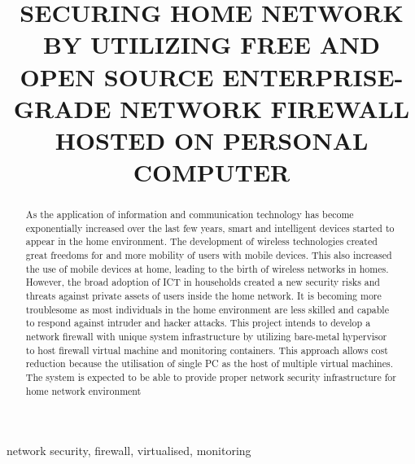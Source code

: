 \documentclass[conference]{IEEEtran}
\begin{document}
\title{SECURING HOME NETWORK BY UTILIZING FREE AND OPEN SOURCE ENTERPRISE-GRADE NETWORK FIREWALL
HOSTED ON PERSONAL COMPUTER}

\author{
\and
{}
}

\maketitle

\begin{abstract}

  As the application of information and communication technology has become exponentially increased
  over the last few years, smart and intelligent devices started to appear in the home environment.
  The development of wireless technologies created great freedoms for and more mobility of users
  with mobile devices. This also increased the use of mobile devices at home, leading to the birth
  of wireless networks in homes. However, the broad adoption of ICT in households created a new
  security risks and threats against private assets of users inside the home network. It is becoming
  more troublesome as most individuals in the home environment are less skilled and capable to
  respond against intruder and hacker attacks. This project intends to develop a network firewall
  with unique system infrastructure by utilizing bare-metal hypervisor to host firewall virtual
  machine and monitoring containers. This approach allows cost reduction because the utilisation of
  single PC as the host of multiple virtual machines. The system is expected to be able to provide
  proper network security infrastructure for home network environment

\end{abstract}

\begin{IEEEkeywords}
network security, firewall, virtualised, monitoring
\end{IEEEkeywords}
\end{document}
